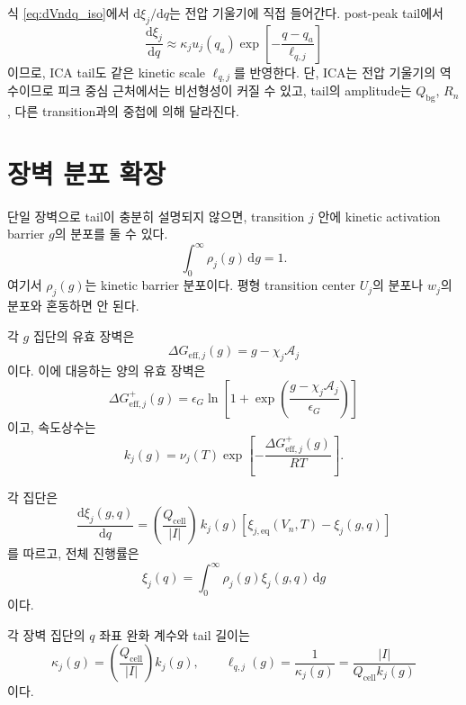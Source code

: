 \documentclass[11pt]{article}
\newcommand{\dd}{\mathrm{d}}
\newcommand{\cell}{\mathrm{cell}}
\newcommand{\bg}{\mathrm{bg}}
\newcommand{\eff}{\mathrm{eff}}
\begin{document}
식 \eqref{eq:dVndq_iso}에서 \(\dd \xi_j/\dd q\)는 전압 기울기에 직접 들어간다. post-peak tail에서
\begin{equation}
\frac{\dd \xi_j}{\dd q}
\approx
\kappa_j u_j(q_a)
\exp\!\left[-\frac{q-q_a}{\ell_{q,j}}\right]
\label{eq:dxidq_tail}
\end{equation}
이므로, ICA tail도 같은 kinetic scale \(\ell_{q,j}\)를 반영한다. 단, ICA는 전압 기울기의 역수이므로 피크 중심 근처에서는 비선형성이 커질 수 있고, tail의 amplitude는 \(Q_{\bg}\), \(R_n\), 다른 transition과의 중첩에 의해 달라진다.

\section{장벽 분포 확장}

단일 장벽으로 tail이 충분히 설명되지 않으면, transition \(j\) 안에 kinetic activation barrier \(g\)의 분포를 둘 수 있다.
\begin{equation}
\int_0^\infty \rho_j(g)\,\dd g
=
1.
\end{equation}
여기서 \(\rho_j(g)\)는 kinetic barrier 분포이다. 평형 transition center \(U_j\)의 분포나 \(w_j\)의 분포와 혼동하면 안 된다.

각 \(g\) 집단의 유효 장벽은
\begin{equation}
\Delta G_{\eff,j}(g)
=
g-\chi_j\mathcal A_j
\end{equation}
이다. 이에 대응하는 양의 유효 장벽은
\begin{equation}
\Delta G_{\eff,j}^{+}(g)
=
\epsilon_G\ln\left[
1+\exp\left(
\frac{g-\chi_j\mathcal A_j}{\epsilon_G}
\right)
\right]
\end{equation}
이고, 속도상수는
\begin{equation}
\boxed{
k_j(g)
=
\nu_j(T)\exp\!\left[-\frac{\Delta G_{\eff,j}^{+}(g)}{RT}\right].
}
\end{equation}

각 집단은
\begin{equation}
\frac{\dd \xi_j(g,q)}{\dd q}
=
\left(\frac{Q_{\cell}}{|I|}\right)
\,k_j(g)
\left[
\xi_{j,\mathrm{eq}}(V_n,T)-\xi_j(g,q)
\right]
\end{equation}
를 따르고, 전체 진행률은
\begin{equation}
\xi_j(q)
=
\int_0^\infty \rho_j(g)\xi_j(g,q)\,\dd g
\end{equation}
이다.

각 장벽 집단의 \(q\) 좌표 완화 계수와 tail 길이는
\begin{equation}
\kappa_j(g)
=
\left(\frac{Q_{\cell}}{|I|}\right)k_j(g),
\qquad
\ell_{q,j}(g)
=
\frac{1}{\kappa_j(g)}
=
\frac{|I|}{Q_{\cell}k_j(g)}
\end{equation}
이다.
\end{document}
